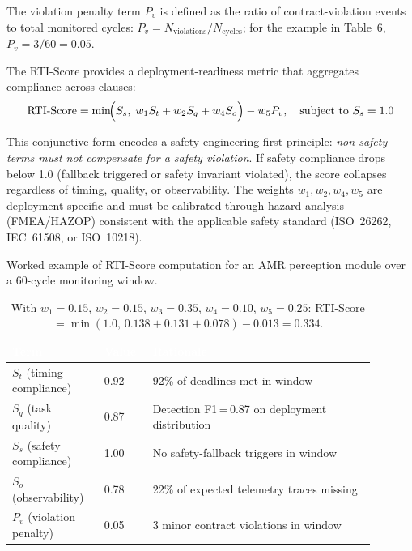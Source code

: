 \documentclass[smallextended]{svjour3}
\begin{document}
The violation penalty term \(P_v\) is defined as the ratio
of contract-violation events to total monitored cycles:
\(P_v = N_{\text{violations}} / N_{\text{cycles}}\);
for the example in Table~6, \(P_v = 3/60 = 0.05\).

The RTI-Score provides a deployment-readiness metric that aggregates compliance across clauses:
\[
  \mathrm{RTI\text{-}Score}
  = \min\!\Bigl(S_s,\; w_1 S_t + w_2 S_q + w_4 S_o\Bigr) - w_5 P_v,
  \quad\text{subject to } S_s = 1.0
\]

This conjunctive form encodes a safety-engineering first principle: \emph{non-safety terms must not compensate for a safety violation}. If safety compliance drops below 1.0 (fallback triggered or safety invariant violated), the score collapses regardless of timing, quality, or observability. The weights $w_1,w_2,w_4,w_5$ are deployment-specific and must be calibrated through hazard analysis (FMEA/HAZOP) consistent with the applicable safety standard (ISO~26262, IEC~61508, or ISO~10218).

\vspace{4pt}
\noindent{}
\vspace{4pt}

\begin{table}[htbp]
  \centering
  \caption{Worked example of RTI-Score computation for an AMR perception module over a 60-cycle monitoring window.}
  \label{tab:rti_example}
  \renewcommand{\arraystretch}{1.15}
  \begin{tabular}{@{}L{0.22\linewidth}C{0.12\linewidth}L{0.55\linewidth}@{}}
    \toprule
    \textcolor{white}{\textbf{Term}} &
    \textcolor{white}{\textbf{Value}} &
    \textcolor{white}{\textbf{Rationale}} \\
    \midrule
    $S_t$ (timing compliance)      & 0.92 & 92\% of deadlines met in window \\
    $S_q$ (task quality)           & 0.87 & Detection F1\,=\,0.87 on deployment distribution \\
    $S_s$ (safety compliance)      & 1.00 & No safety-fallback triggers in window \\
    $S_o$ (observability)          & 0.78 & 22\% of expected telemetry traces missing \\
    $P_v$ (violation penalty)      & 0.05 & 3 minor contract violations in window \\
    \bottomrule
  \end{tabular}
  \renewcommand{\arraystretch}{1}
  \vspace{2pt}
  \caption*{\footnotesize With $w_1\!=\!0.15$, $w_2\!=\!0.15$, $w_3\!=\!0.35$,
    $w_4\!=\!0.10$, $w_5\!=\!0.25$: RTI-Score $= \min(1.0,\,0.138+0.131+0.078) - 0.013 = 0.334$.}
\end{table}
\end{document}
